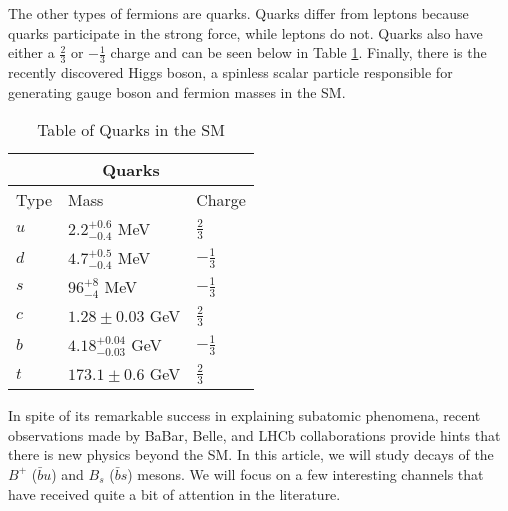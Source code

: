 \documentclass[12pt]{article}
\def \[{\left[}
\begin{document}
The other types of fermions are quarks. Quarks differ from leptons because quarks participate in the strong force, while leptons do not. Quarks also have either a $\frac{2}{3}$ or $-\frac{1}{3}$ charge and can be seen below in Table \ref{table:3}. Finally, there is the recently discovered Higgs boson, a spinless scalar particle responsible for generating gauge boson and fermion masses in the SM.
\begin{table}[htbp!]
\centering
\begin{tabular}{ |p{1cm}||p{4cm}|p{1.5cm}| }
 \hline
 \multicolumn{3}{|c|}{Quarks} \\
 \hline
 Type & Mass & Charge \\
 \hline
 $u$ & $2.2 ^{+0.6}_{\num{-0.4}}$ MeV & $\frac{2}{3}$ \\ [1ex]
 $d$ &  $4.7 ^{+0.5}_{\num{-0.4}}$ MeV & $-\frac{1}{3}$ \\ [1ex]
 $s$ &$96 ^{+8}_{\num{-4}}$ MeV & $-\frac{1}{3}$ \\[1ex]
 $c$ & $1.28 \pm 0.03$ GeV &$\frac{2}{3}$ \\[1ex]
 $b$ & $4.18 ^{+0.04}_{\num{-0.03}}$ GeV  &$-\frac{1}{3}$ \\[1ex]
 $t$ & $173.1 \pm 0.6$ GeV &$\frac{2}{3}$ \\[1ex]
 \hline 
\end{tabular}
\caption{Table of Quarks in the SM \cite{Agashe:2014kda}}
\label{table:3}
\end{table}

In spite of its remarkable success in explaining subatomic phenomena, recent observations made by BaBar, Belle, and LHCb collaborations provide hints that there is new physics beyond the SM. In this article, we will study decays of the $B^+$ ($\bar{b}u$) and $B_s$ ($\bar{b}s$) mesons. We will focus on a few interesting channels that have received quite a bit of attention in the literature.
\end{document}
